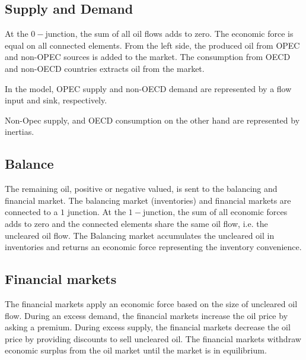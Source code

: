 \subsection{Supply and Demand}
At the $0-$junction, the sum of all oil flows adds to zero.
The economic force is equal on all connected elements.
From the left side, the produced oil from OPEC and non-OPEC sources is added to the market.
The consumption from OECD and non-OECD countries extracts oil from the market.

In the model, OPEC supply and non-OECD demand are represented by a flow input and sink, respectively.


Non-Opec supply, and OECD consumption on the other hand are represented by inertias. 


\subsection{Balance}
The remaining oil, positive or negative valued, is sent to the balancing and financial market.
The balancing market (inventories) and financial markets are connected to a $1$ junction.
At the $1-$junction, the sum of all economic forces adds to zero and the connected elements share the same oil flow, i.e. the uncleared oil flow.
The Balancing market accumulates the uncleared oil in inventories and returns an economic force representing the inventory convenience.

\subsection{Financial markets}
The financial markets apply an economic force based on the size of uncleared oil flow. 
During an excess demand, the financial markets increase the oil price by asking a premium.
During excess supply, the financial markets decrease the oil price by providing discounts to sell uncleared oil.
The financial markets withdraw economic surplus from the oil market until the market is in equilibrium.





